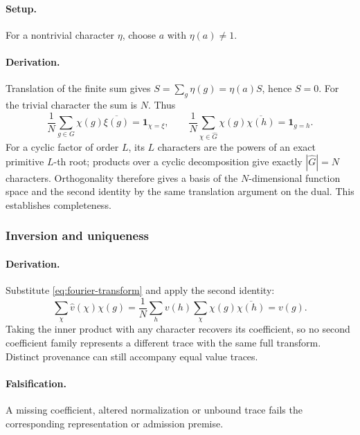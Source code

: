 \paragraph{Setup.}
For a nontrivial character \(\eta\), choose \(a\) with \(\eta(a)\ne1\).
\paragraph{Derivation.}
Translation of the finite sum gives \(S=\sum_g\eta(g)=\eta(a)S\), hence
\(S=0\). For the trivial character the sum is \(N\). Thus
\begin{equation}
\frac1N\sum_{g\in G}\chi(g)\overline{\xi(g)}
=\mathbf1_{\chi=\xi},\qquad
\frac1N\sum_{\chi\in\widehat G}\chi(g)\overline{\chi(h)}
=\mathbf1_{g=h}.
\label{eq:fourier-orthogonality}
\end{equation}
For a cyclic factor of order \(L\), its \(L\) characters are the powers of
an exact primitive \(L\)-th root; products over a cyclic decomposition give
exactly \(|\widehat G|=N\) characters. Orthogonality therefore gives a basis
of the \(N\)-dimensional function space and the second identity by the same
translation argument on the dual. This establishes completeness.

\subsubsection{Inversion and uniqueness}
\paragraph{Derivation.}
Substitute \eqref{eq:fourier-transform} and apply the second identity:
\begin{equation}
\sum_{\chi}\widehat v(\chi)\chi(g)
=\frac1N\sum_h v(h)\sum_\chi\chi(g)\overline{\chi(h)}
=v(g).
\label{eq:fourier-inversion}
\end{equation}
Taking the inner product with any character recovers its coefficient, so
no second coefficient family represents a different trace with the same
full transform. Distinct provenance can still accompany equal value traces.
\paragraph{Falsification.} A missing coefficient, altered normalization or
unbound trace fails the corresponding representation or admission premise.


